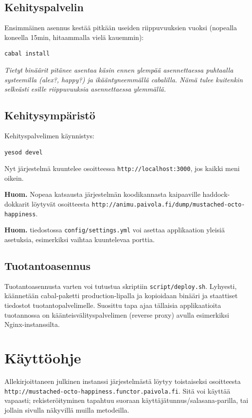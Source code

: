 \documentclass[a4paper,12pt]{report}
\begin{document}
\subsection{Kehityspalvelin}
Ensimmäinen asennus kestää pitkään useiden riippuvuuksien vuoksi (nopealla
koneella 15min, hitaammalla vielä kauemmin):
\begin{verbatim}
cabal install
\end{verbatim}

\textit{Tietyt binäärit pitänee asentaa käsin ennen ylempää asennettaessa
puhtaalla systeemilla (alex?, happy?) ja ikääntyneemmällä cabalilla. Nämä tulee
kuitenkin selkeästi esille riippuvuuksia asennettaessa ylemmällä.}

\subsection{Kehitysympäristö}
Kehityspalvelimen käynnistys:
\begin{verbatim}
yesod devel
\end{verbatim}
Nyt järjestelmä kuuntelee osoitteessa \texttt{http://localhost:3000}, jos kaikki
meni oikein.

\textbf{Huom.} Nopeaa katsausta järjestelmän koodikannasta kaipaaville
haddock-dokkarit löytyvät osoitteesta
\texttt{http://animu.paivola.fi/dump/mustached-octo-happiness}.

\textbf{Huom.} tiedostossa \texttt{config/settings.yml} voi asettaa applikaation
yleisiä asetuksia, esimerkiksi vaihtaa kuuntelevaa porttia.

\subsection{Tuotantoasennus}
Tuotantoasennusta varten voi tutustua skriptiin \texttt{script/deploy.sh}.
Lyhyesti, käännetään cabal-paketti production-lipalla ja kopioidaan binääri ja
staattiset tiedostot tuotantopalvelimelle. Suosittu tapa ajaa tällaisia
applikaatioita tuotannossa on käänteisvälityspalvelimen (reverse proxy) avulla
esimerkiksi Nginx-instanssilta.

\section{Käyttöohje}
Allekirjoittaneen julkinen instanssi järjestelmästä löytyy toistaiseksi osoitteesta
\\\texttt{http://mustached-octo-happiness.functor.paivola.fi}. Sitä voi käyttää
vapaasti; rekisteröityminen tapahtuu suoraan käyttäjätunnus/salasana-parilla,
tai jollain sivulla näkyvillä muilla metodeilla.
\end{document}
